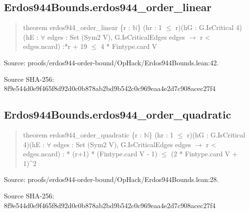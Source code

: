 \documentclass[11pt,a4paper]{article}
\begin{document}
\begin{samepage}
\subsection{Erdos944Bounds.erdos944\_order\_linear}
\begin{quote}\small\ttfamily theorem erdos944\_order\_linear \{r : \ensuremath{\mathbb{N}}\} (hr : 1 \ensuremath{\leq} r)\newline     (hG : G.IsCritical 4)\newline     (hE : \ensuremath{\forall} edges : Set (Sym2 V), G.IsCriticalEdges edges \ensuremath{\to} r < edges.ncard) :*r + 19 \ensuremath{\leq} 4 * Fintype.card V\end{quote}
{\small Source: proofs/erdos944-order-bound/OpHack/Erdos944Bounds.lean:42.\par}

{\small Source SHA-256: 8f9e544d0e9f465f8d92d0c0b878ab2bd9b542c0c969eaa4e2d7c908acec27f4\par}

\end{samepage}
\begin{samepage}
\subsection{Erdos944Bounds.erdos944\_order\_quadratic}
\begin{quote}\small\ttfamily theorem erdos944\_order\_quadratic \{r : \ensuremath{\mathbb{N}}\} (hr : 1 \ensuremath{\leq} r)\newline     (hG : G.IsCritical 4)\newline     (hE : \ensuremath{\forall} edges : Set (Sym2 V), G.IsCriticalEdges edges \ensuremath{\to} r < edges.ncard) : * (r+1) * (Fintype.card V - 1) \ensuremath{\leq} (2 * Fintype.card V + 1)\textasciicircum{}2\end{quote}
{\small Source: proofs/erdos944-order-bound/OpHack/Erdos944Bounds.lean:28.\par}

{\small Source SHA-256: 8f9e544d0e9f465f8d92d0c0b878ab2bd9b542c0c969eaa4e2d7c908acec27f4\par}

\end{samepage}
\end{document}
